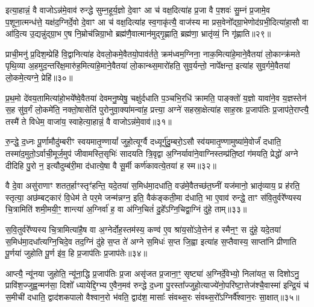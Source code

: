 इत्या॒हान्नं॒ वै वाजो\-ऽन्न॑मे॒वाव॑ रुन्द्धे सुम्न॒हूर्य॒ज्ञो दे॒वाꣳ आ च॑ वक्ष॒दित्या॑ह प्र॒जा वै प॒शवः॑ सु॒म्नं प्र॒जामे॒व प॒शूना॒त्मन्ध॑त्ते॒ यक्ष॑द॒ग्निर्दे॒वो दे॒वाꣳ आ च॑ वक्ष॒दित्या॑ह स्व॒गाकृ॑त्यै॒ वाज॑स्य मा प्रस॒वेनो᳚द्ग्रा॒भेणोद॑ग्रभी॒दित्या॑हा॒सौ वा आ॑दि॒त्य उ॒द्यन्नु॑द्ग्रा॒भ ए॒ष नि॒म्रोच॑न्निग्रा॒भो ब्रह्म॑णै॒वात्मान॑मुद्गृ॒ह्णाति॒ ब्रह्म॑णा॒ भ्रातृ॑व्यं॒ नि गृ॑ह्णाति॥२९॥

{\anuvakamend[{प्रा॒णैः पोषो᳚\-ऽप्र॒त्याग्नी᳚ध्रे॒ पति॑मे॒ष दश॑ च॥६॥}]}

प्राची॒मनु॑ प्र॒दिश॒म्प्रेहि॑ वि॒द्वानित्या॑ह देवलो॒कमे॒वैतयो॒पाव॑र्तते॒ क्रम॑ध्वम॒ग्निना॒ नाक॒मित्या॑हे॒माने॒वैतया॑ लो॒कान्क्र॑मते पृथि॒व्या अ॒हमुद॒न्तरि॑क्ष॒मारु॑ह॒मित्या॑हे॒माने॒वैतया॑ लो॒कान्थ्स॒मारो॑हति॒ सुव॒र्यन्तो॒ नापे᳚क्षन्त॒ इत्या॑ह सुव॒र्गमे॒वैतया॑ लो॒कमे॒त्यग्ने॒ प्रेहि॑॥३०॥

प्र॒थ॒मो दे॑वय॒तामित्या॑हो॒भये᳚ष्वे॒वैतया॑ देवमनु॒ष्येषु॒ चक्षु॑र्दधाति प॒ञ्चभि॒रधि॑ क्रामति॒ पाङ्क्तो॑ य॒ज्ञो यावा॑ने॒व य॒ज्ञस्तेन॑ स॒ह सु॑व॒र्गं लो॒कमे॑ति॒ नक्तो॒षासेति॑ पुरोनुवा॒क्या॑मन्वा॑ह॒ प्रत्त्या॒ अग्ने॑ सहस्रा॒क्षेत्या॑ह साह॒स्रः प्र॒जाप॑तिः प्र॒जाप॑ते॒राप्त्यै॒ तस्मै॑ ते विधेम॒ वाजा॑य॒ स्वाहेत्या॒हान्नं॒ वै वाजो\-ऽन्न॑मे॒वाव॑॥३१॥

रु॒न्द्धे॒ द॒ध्नः पू॒र्णामौदु॑म्बरीꣳ स्वयमातृ॒ण्णायां᳚ जुहो॒त्यूर्ग्वै दध्यूर्गु॑दु॒म्बरो॒\-ऽसौ स्व॑यमातृ॒ण्णामुष्या॑मे॒वोर्जं॑ दधाति॒ तस्मा॑द॒मुतो॒\-ऽर्वाची॒मूर्ज॒मुप॑ जीवामस्ति॒सृभिः॑ सादयति त्रि॒वृद्वा अ॒ग्निर्यावा॑ने॒वाग्निस्तम्प्र॑ति॒ष्ठां ग॑मयति॒ प्रेद्धो॑ अग्ने दीदिहि पु॒रो न॒ इत्यौदुम्ब॑री॒मा द॑धात्ये॒षा वै सू॒र्मी कर्ण॑कावत्ये॒तया॑ ह स्म॥३२॥

वै दे॒वा असु॑राणाꣳ शतत॒र्\mbox{}हाꣳस्तृꣳ॑हन्ति॒ यदे॒तया॑ स॒मिध॑मा॒दधा॑ति॒ वज्र॑मे॒वैतच्छ॑त॒घ्नीं यज॑मानो॒ भ्रातृ॑व्याय॒ प्र ह॑रति॒ स्तृत्या॒ अछ॑म्बट्कारं वि॒धेम॑ ते पर॒मे जन्म॑न्नग्न॒ इति॒ वैक॑ङ्कती॒मा द॑धाति॒ भा ए॒वाव॑ रुन्द्धे॒ ताꣳ स॑वि॒तुर्वरे᳚ण्यस्य चि॒त्रामिति॑ शमी॒मयी॒ꣳ॒ शान्त्या॑ अ॒ग्निर्वा॑ ह॒ वा अ॑ग्नि॒चितं॑ दु॒हे᳚\-ऽग्नि॒चिद्वा॒ग्निं दु॑हे॒ ताम्॥३३॥

स॒वि॒तुर्वरे᳚ण्यस्य चि॒त्रामित्या॑है॒ष वा अ॒ग्नेर्दोह॒स्तम॑स्य॒ कण्व॑ ए॒व श्रा॑य॒सो॑\-ऽवे॒त्तेन॑ ह स्मैन॒ꣳ॒ स दु॑हे॒ यदे॒तया॑ स॒मिध॑मा॒दधा᳚त्यग्नि॒चिदे॒व तद॒ग्निं दु॑हे स॒प्त ते॑ अग्ने स॒मिधः॑ स॒प्त जि॒ह्वा इत्या॑ह स॒प्तैवास्य॒ साप्ता॑नि प्रीणाति पू॒र्णया॑ जुहोति पू॒र्ण इ॑व॒ हि प्र॒जाप॑तिः प्र॒जाप॑तेः॥३४॥

आप्त्यै॒ न्यू॑नया जुहोति॒ न्यू॑ना॒द्धि प्र॒जाप॑तिः प्र॒जा असृ॑जत प्र॒जाना॒ꣳ॒ सृष्ट्या॑ अ॒ग्निर्दे॒वेभ्यो॒ निला॑यत॒ स दिशो\-ऽनु॒ प्रावि॑श॒ज्जुह्व॒न्मन॑सा॒ दिशो᳚ ध्यायेद्दि॒ग्भ्य ए॒वैन॒मव॑ रुन्द्धे द॒ध्ना पु॒रस्ता᳚ज्जुहो॒त्याज्ये॑नो॒परि॑ष्टा॒त्तेज॑श्चै॒वास्मा॑ इन्द्रि॒यं च॑ स॒मीची॑ दधाति॒ द्वाद॑शकपालो वैश्वान॒रो भ॑वति॒ द्वाद॑श॒ मासाः᳚ संवथ्स॒रः सं॑वथ्स॒रो᳚\-ऽग्निर्वै᳚श्वान॒रः सा॒क्षात्॥३५॥

